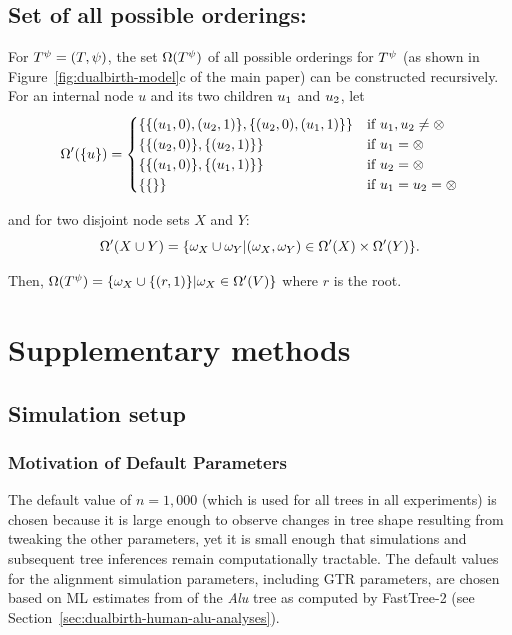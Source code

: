 \subsection{Set of all possible orderings:}
For $T^\psi =(T,\psi)$, the set $\Omega(T^\psi)$ of all possible orderings for $T^\psi$ (as shown in Figure~\ref{fig:dualbirth-model}c of the main paper) can be constructed recursively. For an internal node $u$ and its two children $u_{1}$ and $u_{2}$, let
\begin{equation*}
\Omega'(\{u\}) =
\begin{cases}
\{\{(u_{1},0),(u_{2},1)\},\{(u_{2},0),(u_{1},1)\}\}
&  \text{if } u_{1},u_{2}\neq \otimes \\
\{\{(u_{2},0)\},\{(u_{2},1)\}\} 
& \text{if } u_{1}= \otimes\\
\{\{(u_{1},0)\},\{(u_{1},1)\} \}
& \text{if } u_{2}= \otimes\\
\{\{\}\} &  \text{if } u_{1}=u_{2}= \otimes 
\end{cases}
\end{equation*}
\begin{small}
and for two disjoint node sets $X$ and $Y$:
\begin{equation}\label{sup:eq:sdall}
\Omega'(X\cup Y) = \{\omega_X \cup \omega_Y| (\omega_X,\omega_Y ) \in \Omega'(X) \times \Omega'(Y)\}.
\end{equation}
\end{small}
Then, $\Omega(T^\psi)=\{\omega_X\cup\{(r,1)\} | \omega_X\in \Omega'(V)\}$ where $r$ is the root.

\section{Supplementary methods}
\subsection{Simulation setup}\label{sup:simsetup}
\subsubsection{Motivation of Default Parameters}\label{sup:simsetup-mot}
The default value of $n = 1,000$ (which is used for all trees in all experiments) is chosen because it is large enough to observe changes in tree shape resulting from tweaking the other parameters, yet it is small enough that simulations and subsequent tree inferences remain computationally tractable. The default values for the alignment simulation parameters, including \gls{GTR} parameters, are chosen based on ML estimates from of the \textit{Alu}  tree as computed by FastTree-2 (see Section~\ref{sec:dualbirth-human-alu-analyses}).

